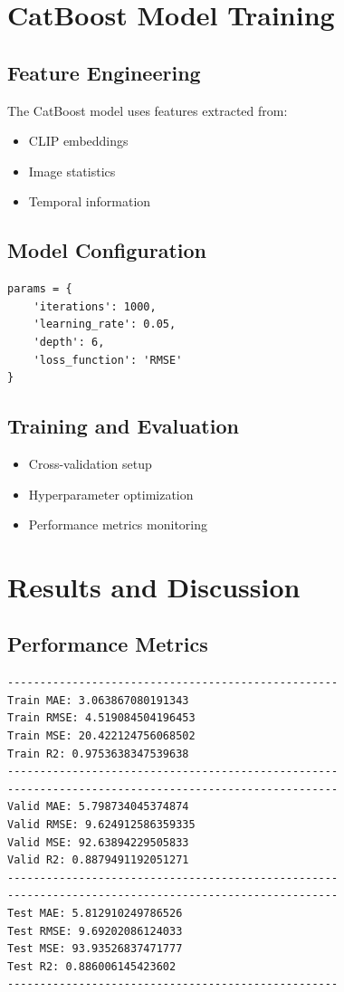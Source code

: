 \documentclass[11pt,a4paper]{article}
\begin{document}
\section{CatBoost Model Training}
\subsection{Feature Engineering}
The CatBoost model uses features extracted from:
\begin{itemize}
    \item CLIP embeddings
    \item Image statistics
    \item Temporal information
\end{itemize}

\subsection{Model Configuration}
\begin{lstlisting}
params = {
    'iterations': 1000,
    'learning_rate': 0.05,
    'depth': 6,
    'loss_function': 'RMSE'
}
\end{lstlisting}

\subsection{Training and Evaluation}
\begin{itemize}
    \item Cross-validation setup
    \item Hyperparameter optimization
    \item Performance metrics monitoring
\end{itemize}

\section{Results and Discussion}
\subsection{Performance Metrics}
\begin{verbatim}
---------------------------------------------------
Train MAE: 3.063867080191343
Train RMSE: 4.519084504196453
Train MSE: 20.422124756068502
Train R2: 0.9753638347539638
---------------------------------------------------
---------------------------------------------------
Valid MAE: 5.798734045374874
Valid RMSE: 9.624912586359335
Valid MSE: 92.63894229505833
Valid R2: 0.8879491192051271
---------------------------------------------------
---------------------------------------------------
Test MAE: 5.812910249786526
Test RMSE: 9.69202086124033
Test MSE: 93.93526837471777
Test R2: 0.886006145423602
---------------------------------------------------

\end{verbatim}
\end{document}
